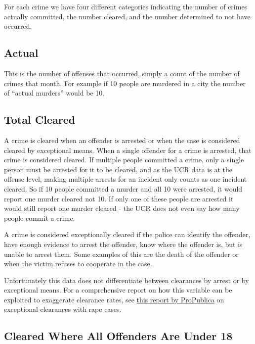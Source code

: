 \documentclass[
  12pt,
  openany]{book}
\begin{document}
For each crime we have four different categories indicating the number of crimes actually committed, the number cleared, and the number determined to not have occurred.

\hypertarget{actual}{%
\subsection{Actual}\label{actual}}

This is the number of offenses that occurred, simply a count of the number of crimes that month. For example if 10 people are murdered in a city the number of ``actual murders'' would be 10.

\hypertarget{total-cleared}{%
\subsection{Total Cleared}\label{total-cleared}}

A crime is cleared when an offender is arrested or when the case is considered cleared by exceptional means. When a single offender for a crime is arrested, that crime is considered cleared. If multiple people committed a crime, only a single person must be arrested for it to be cleared, and as the UCR data is at the offense level, making multiple arrests for an incident only counts as one incident cleared. So if 10 people committed a murder and all 10 were arrested, it would report one murder cleared not 10. If only one of these people are arrested it would still report one murder cleared - the UCR does not even say how many people commit a crime.

A crime is considered exceptionally cleared if the police can identify the offender, have enough evidence to arrest the offender, know where the offender is, but is unable to arrest them. Some examples of this are the death of the offender or when the victim refuses to cooperate in the case.

Unfortunately this data does not differentiate between clearances by arrest or by exceptional means. For a comprehensive report on how this variable can be exploited to exaggerate clearance rates, see \href{https://www.propublica.org/article/when-it-comes-to-rape-just-because-a-case-is-cleared-does-not-mean-solved}{this report by ProPublica} on exceptional clearances with rape cases.

\hypertarget{cleared-where-all-offenders-are-under-18}{%
\subsection{Cleared Where All Offenders Are Under 18}\label{cleared-where-all-offenders-are-under-18}}
\end{document}
